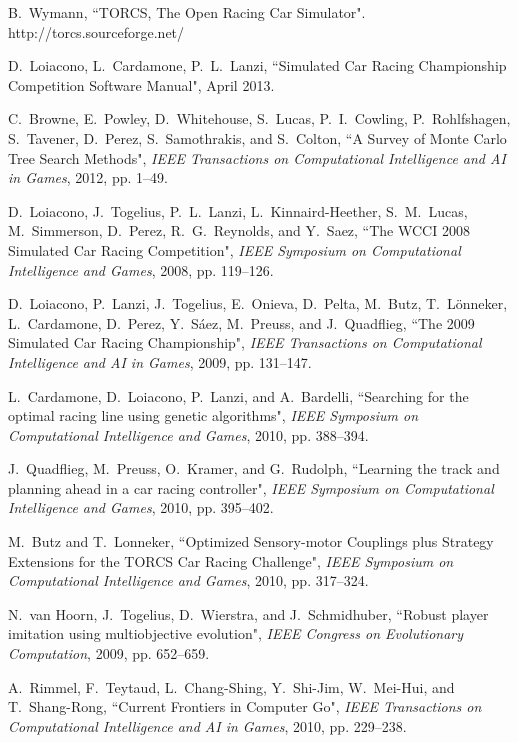 \documentclass[conference]{IEEEtran}
\begin{document}
\begin{thebibliography}{22}
B.~Wymann, ``TORCS, The Open Racing Car Simulator". http://torcs.sourceforge.net/

D.~Loiacono, L.~Cardamone, P.~L.~Lanzi, ``Simulated Car Racing Championship Competition Software Manual", April 2013.

C.~Browne, E.~Powley, D.~Whitehouse, S.~Lucas, P.~I.~Cowling, P.~Rohlfshagen, S.~Tavener, D.~Perez, S.~Samothrakis, and S.~Colton, ``A Survey of Monte Carlo Tree Search Methods", \emph{IEEE Transactions on Computational Intelligence and AI in Games}, 2012, pp. 1--49.

D.~Loiacono, J.~Togelius, P.~L.~Lanzi, L.~Kinnaird-Heether, S.~M.~Lucas, M.~Simmerson, D.~Perez, R.~G.~Reynolds, and Y.~Saez, ``The WCCI 2008 Simulated Car Racing Competition", \emph{IEEE Symposium on Computational Intelligence and Games}, 2008, pp. 119--126.

D.~Loiacono, P.~Lanzi, J.~Togelius, E.~Onieva, D.~Pelta, M.~Butz, T.~Lönneker, L.~Cardamone, D.~Perez, Y.~Sáez, M.~Preuss, and J.~Quadflieg, ``The 2009 Simulated Car Racing Championship", \emph{IEEE Transactions on Computational Intelligence and AI in Games}, 2009, pp. 131--147.

L.~Cardamone, D.~Loiacono, P.~Lanzi, and A.~Bardelli, ``Searching for the optimal racing line using genetic algorithms", \emph{IEEE Symposium on Computational Intelligence and Games}, 2010, pp. 388--394.

J.~Quadflieg, M.~Preuss, O.~Kramer, and G.~Rudolph, ``Learning the track and planning ahead in a car racing controller", \emph{IEEE Symposium on Computational Intelligence and Games}, 2010, pp. 395--402.

M.~Butz and T.~Lonneker, ``Optimized Sensory-motor Couplings plus Strategy Extensions for the TORCS Car Racing Challenge", \emph{IEEE Symposium on Computational Intelligence and Games}, 2010, pp. 317--324.

N.~van Hoorn, J.~Togelius, D.~Wierstra, and J.~Schmidhuber, ``Robust player imitation using multiobjective evolution", \emph{IEEE Congress on Evolutionary Computation}, 2009, pp. 652--659.

A.~Rimmel, F.~Teytaud, L.~Chang-Shing, Y.~Shi-Jim, W.~Mei-Hui, and T.~Shang-Rong, ``Current Frontiers in Computer Go", \emph{IEEE Transactions on Computational Intelligence and AI in Games}, 2010, pp. 229--238.


\end{thebibliography}
\end{document}
